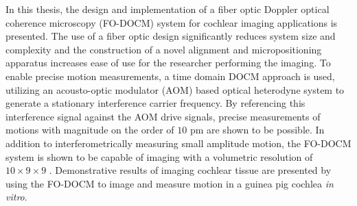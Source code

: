 % 
% 
%

In this thesis, the design and implementation of a fiber optic Doppler optical coherence microscopy (FO-DOCM) system for cochlear imaging applications is presented. The use of a fiber optic design significantly reduces system size and complexity and the construction of a novel alignment and micropositioning apparatus increases ease of use for the researcher performing the imaging. To enable precise motion measurements, a time domain DOCM approach is used, utilizing an acousto-optic modulator (AOM) based optical heterodyne system to generate a stationary interference carrier frequency. By referencing this interference signal against the AOM drive signals, precise measurements of motions with magnitude on the order of $10$ pm are shown to be possible. In addition to interferometrically measuring small amplitude motion, the FO-DOCM system is shown to be capable of imaging with a volumetric resolution of $10 \times 9 \times 9$ \micron. Demonstrative results of imaging cochlear tissue are presented by using the FO-DOCM to image and measure motion in a guinea pig cochlea {\em in vitro}.

